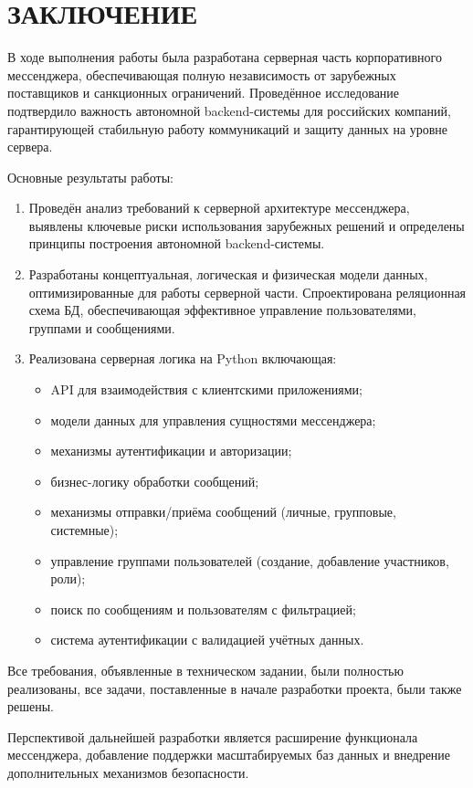 \section*{ЗАКЛЮЧЕНИЕ}

В ходе выполнения работы была разработана серверная часть корпоративного мессенджера, обеспечивающая полную независимость от зарубежных поставщиков и санкционных ограничений. Проведённое исследование подтвердило важность автономной backend-системы для российских компаний, гарантирующей стабильную работу коммуникаций и защиту данных на уровне сервера.

Основные результаты работы:

\begin{enumerate}
\item Проведён анализ требований к серверной архитектуре мессенджера, выявлены ключевые риски использования зарубежных решений и определены принципы построения автономной backend-системы.

\item Разработаны концептуальная, логическая и физическая модели данных, оптимизированные для работы серверной части. Спроектирована реляционная схема БД, обеспечивающая эффективное управление пользователями, группами и сообщениями.

\item Реализована серверная логика на Python включающая:

\begin{itemize}
	\item API для взаимодействия с клиентскими приложениями;
	\item модели данных для управления сущностями мессенджера;
	\item механизмы аутентификации и авторизации;
	\item бизнес-логику обработки сообщений;
	\item механизмы отправки/приёма сообщений (личные, групповые, системные);
	\item управление группами пользователей (создание, добавление участников, роли);
	\item поиск по сообщениям и пользователям с фильтрацией;
	\item система аутентификации с валидацией учётных данных.
\end{itemize}

\end{enumerate}

Все требования, объявленные в техническом задании, были полностью реализованы, все задачи, поставленные в начале разработки проекта, были также решены.

Перспективой дальнейшей разработки является расширение функционала мессенджера, добавление поддержки масштабируемых баз данных и внедрение дополнительных механизмов безопасности.